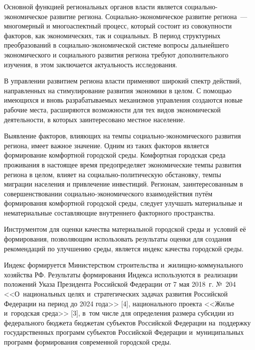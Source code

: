 



\makeProcTitle
{}

Основной функцией региональных органов власти является социально-экономическое развитие региона. Социально-экономическое развитие региона~--- многомерный и многоаспектный процесс, который состоит из совокупности факторов, как экономических, так и социальных. В период структурных преобразований в социально-экономической системе вопросы дальнейшего экономического и социального развития региона требуют дополнительного изучения, в этом заключается актуальность исследования.

В управлении развитием региона власти применяют широкий спектр действий, направленных на стимулирование развития экономики в целом. С помощью имеющихся и вновь разрабатываемых механизмов управления создаются новые рабочие места, расширяются возможности для тех видов экономической деятельности, в которых заинтересовано местное население.

Выявление факторов, влияющих на темпы социально-экономического развития региона, имеет важное значение. Одним из таких факторов является формирование комфортной городской среды. Комфортная городская среда проживания в настоящее время предопределяет экономические темпы развития региона в целом, влияет на социально-политическую обстановку, темпы миграции населения и привлечение инвестиций. Регионам, заинтересованным в совершенствовании социально-экономического взаимодействия путём формирования комфортной городской среды, следует улучшать материальные и нематериальные составляющие внутреннего факторного пространства.

Инструментом для оценки качества материальной городской среды и~ус\-ло\-вий её формирования, позволяющим использовать результаты оценки для создания рекомендаций по улучшению среды, является индекс качества городской среды.

Индекс формируется Министерством строительства и жилищно-ком\-му\-наль\-но\-го хозяйства РФ. Результаты формирования Индекса используются в реализации положений Указа Президента Российской Федерации от 7 мая 2018~г. №~204 <<О национальных целях и стратегических задачах развития Российской Федерации на период до 2024 года>> [4], национального проекта <<Жилье и городская среда>> [3], в том числе для определения размера субсидии из федерального бюджета бюджетам субъектов Российской Федерации на~поддержку государственных программ субъектов Российской Федерации и~муниципальных программ формирования современной городской среды.

